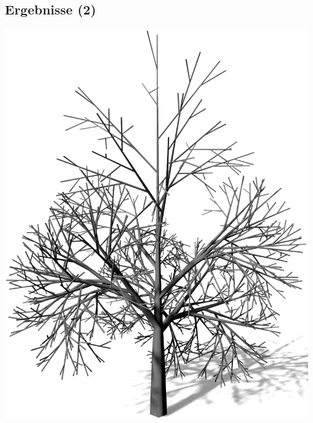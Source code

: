 
\newpage
{}
\subsection{Ergebnisse (2)}





\newpage
\begin{center}
	\vfill
	\begin{minipage}[c]{0.45\textwidth}
		\centering
		\includegraphics[height=.9\textheight]{images/LS_Monopodial_1}
	\end{minipage}
	\hspace{.05\textwidth}	
	\begin{minipage}[c]{0.45\textwidth}
		\centering

\end{minipage}
\end{center}
